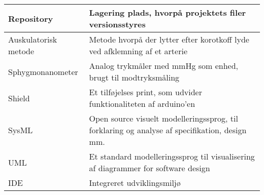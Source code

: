 \begin{longtable}{ |p{} |p{}| }
		\hline
		Repository & Lagering plads, hvorpå projektets filer versionsstyres \\
		\hline
		Auskulatorisk metode & Metode hvorpå der lytter efter korotkoff lyde ved afklemning af et arterie \\
		\hline
		Sphygmonanometer & Analog trykmåler med mmHg som enhed, brugt til modtryksmåling  \\
		\hline
		Shield & Et tilføjelses print, som udvider funktionaliteten af arduino'en \\
		\hline
		SysML & Open source visuelt modelleringssprog, til forklaring og analyse af specifikation, design mm.  \\
		\hline
		UML & Et standard modelleringssprog til visualisering af diagrammer for software design \\
		\hline
		IDE & Integreret udviklingsmiljø \\
		\hline
		
		
	\end{longtable}
\newpage